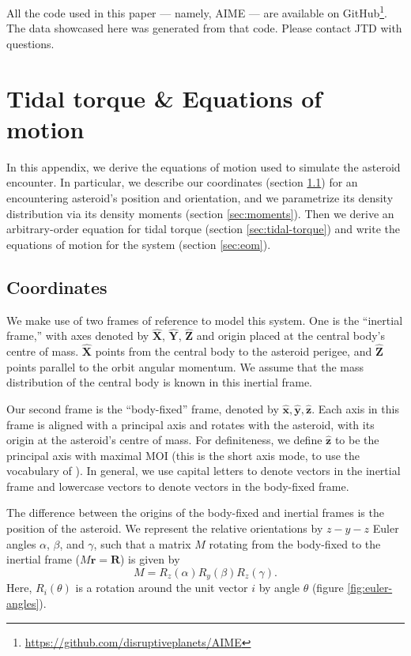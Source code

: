 \documentclass[fleqn,usenatbib]{mnras}
\newcommand{\unit}[1]{\bm{\hat{#1}}}
\begin{document}
All the code used in this paper --- namely, AIME --- are available on GitHub\footnote{\url{https://github.com/disruptiveplanets/AIME}}. The data showcased here was generated from that code. Please contact JTD with questions.







\appendix

\section{Tidal torque \& Equations of motion}
\label{app:eom}

In this appendix, we derive the equations of motion used to simulate the asteroid encounter. In particular, we describe our coordinates (section \ref{sec:coordinates}) for an encountering asteroid's position and orientation, and we parametrize its density distribution via its density moments (section \ref{sec:moments}). Then we derive an arbitrary-order equation for tidal torque (section \ref{sec:tidal-torque}) and write the equations of motion for the system (section \ref{sec:eom}).

\subsection{Coordinates}
\label{sec:coordinates}

We make use of two frames of reference to model this system. One is the ``inertial frame,'' with axes denoted by $\unit{X}$, $\unit{Y}$, $\unit{Z}$ and origin placed at the central body's centre of mass. $\unit{X}$ points from the central body to the asteroid perigee, and $\unit{Z}$ points parallel to the orbit angular momentum. We assume that the mass distribution of the central body is known in this inertial frame.

Our second frame is the ``body-fixed'' frame, denoted by $\unit{x}, \unit{y}, \unit{z}$. Each axis in this frame is aligned with a principal axis and rotates with the asteroid, with its origin at the asteroid's centre of mass. For definiteness, we define $\unit{z}$ to be the principal axis with maximal MOI (this is the short axis mode, to use the vocabulary of \cite{kaasalainen2001interpretation}). In general, we use capital letters to denote vectors in the inertial frame and lowercase vectors to denote vectors in the body-fixed frame.

The difference between the origins of the body-fixed and inertial frames is the position of the asteroid. We represent the relative orientations by $z-y-z$ Euler angles $\alpha$, $\beta$, and $\gamma$, such that a matrix $M$ rotating from the body-fixed to the inertial frame ($M\bm{r} = \bm{R}$) is given by
\begin{equation}
M = R_z(\alpha) R_y(\beta) R_z(\gamma).
\label{eqn:euler-angles}
\end{equation}
Here, $R_i(\theta)$ is a rotation around the unit vector $i$ by angle $\theta$ (figure \ref{fig:euler-angles}).
\end{document}
